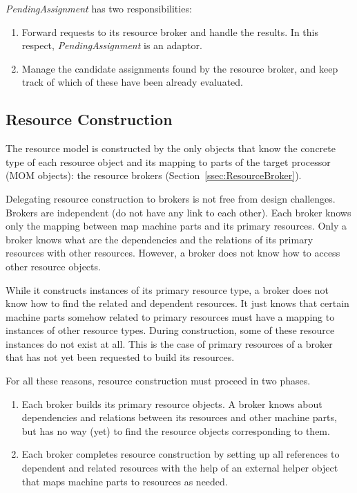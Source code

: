 \documentclass[a4paper,twoside]{tce}
\begin{document}
\emph{PendingAssignment} has two responsibilities:
%
\begin{enumerate}
\item %
  Forward requests to its resource broker and handle the results. In this
  respect, \emph{PendingAssignment} is an adaptor.
\item %
  Manage the candidate assignments found by the resource broker, and keep
  track of which of these have been already evaluated.
\end{enumerate}

\subsection{Resource Construction}
\label{ssec:resource-construction}

The resource model is constructed by the only objects that know the concrete
type of each resource object and its mapping to parts of the target
processor (MOM objects): the resource brokers
(Section~\ref{ssec:ResourceBroker}).

Delegating resource construction to brokers is not free from design
challenges.
%
Brokers are independent (do not have any link to each other). Each broker
knows only the mapping between map machine parts and its primary resources.
%
Only a broker knows what are the dependencies and the relations of its
primary resources with other resources. However, a broker does not know how
to access other resource objects.

While it constructs instances of its primary resource type, a broker does
not know how to find the related and dependent resources. It just knows that
certain machine parts somehow related to primary resources must have a
mapping to instances of other resource types.
%
During construction, some of these resource instances do not exist at all.
This is the case of primary resources of a broker that has not yet been
requested to build its resources.

For all these reasons, resource construction must proceed in two phases.
%
\begin{enumerate}
\item%
  Each broker builds its primary resource objects. A broker knows about
  dependencies and relations between its resources and other machine parts,
  but has no way (yet) to find the resource objects corresponding to them.
\item%
  Each broker completes resource construction by setting up all references
  to dependent and related resources with the help of an external helper
  object that maps machine parts to resources as needed.
\end{enumerate}
\end{document}
